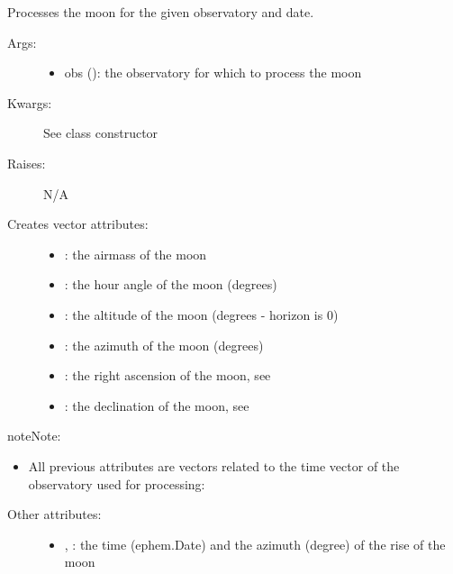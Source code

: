 \documentclass[letterpaper,10pt,english]{sphinxmanual}
\begin{document}
\begin{fulllineitems}

\begin{fulllineitems}
\label{astroobs:astroobs.Moon.Moon.process}
Processes the moon for the given observatory and date.
\begin{description}
\item[{Args:}] \leavevmode\begin{itemize}
\item {} 
obs (): the observatory for which to process the moon

\end{itemize}

\item[{Kwargs:}] \leavevmode
See class constructor

\item[{Raises:}] \leavevmode
N/A

\item[{Creates vector attributes:}] \leavevmode\begin{itemize}
\item {} 
: the airmass of the moon

\item {} 
: the hour angle of the moon (degrees)

\item {} 
: the altitude of the moon (degrees - horizon is 0)

\item {} 
: the azimuth of the moon (degrees)

\item {} 
: the right ascension of the moon, see 

\item {} 
: the declination of the moon, see 

\end{itemize}

\end{description}

\begin{notice}{note}{Note:}\begin{itemize}
\item {} 
All previous attributes are vectors related to the time vector of the observatory used for processing: 

\end{itemize}
\end{notice}
\begin{description}
\item[{Other attributes:}] \leavevmode\begin{itemize}
\item {} 
, : the time (ephem.Date) and the azimuth (degree) of the rise of the moon


\end{itemize}
\end{description}
\end{fulllineitems}
\end{fulllineitems}
\end{document}
